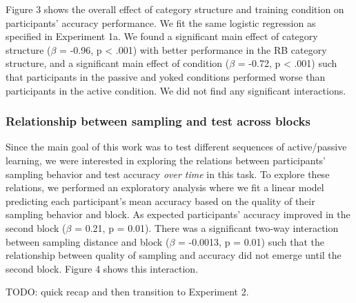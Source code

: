 \documentclass[10pt, letterpaper]{article}
\begin{document}
Figure 3 shows the overall effect of category structure and training
condition on participants' accuracy performance. We fit the same
logistic regression as specified in Experiment 1a. We found a
significant main effect of category structure (\(\beta\) = -0.96, p
\textless{} .001) with better performance in the RB category structure,
and a significant main effect of condition (\(\beta\) = -0.72, p
\textless{} .001) such that participants in the passive and yoked
conditions performed worse than participants in the active condition. We
did not find any significant interactions.

\subsubsection{Relationship between sampling and test across
blocks}\label{relationship-between-sampling-and-test-across-blocks}

Since the main goal of this work was to test different sequences of
active/passive learning, we were interested in exploring the relations
between participants' sampling behavior and test accuracy \emph{over
time} in this task. To explore these relations, we performed an
exploratory analysis where we fit a linear model predicting each
participant's mean accuracy based on the quality of their sampling
behavior and block. As expected participants' accuracy improved in the
second block (\(\beta\) = 0.21, p = 0.01). There was a significant
two-way interaction between sampling distance and block (\(\beta\) =
-0.0013, p = 0.01) such that the relationship between quality of
sampling and accuracy did not emerge until the second block. Figure 4
shows this interaction.

TODO: quick recap and then transition to Experiment 2.
\end{document}
